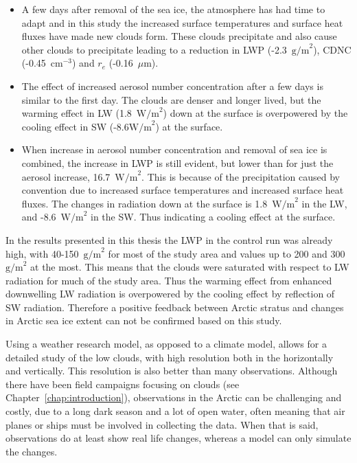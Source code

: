 \begin{itemize}
\item A few days after removal of the sea ice, the atmosphere has had time to adapt and in this study the increased surface temperatures and surface heat fluxes have made new clouds form. These clouds precipitate and also cause other clouds to precipitate leading to a reduction in LWP (-2.3~$\text{g/m}^2$), CDNC (-0.45~$\text{cm}^{-3}$) and $r_e$ (-0.16~$\mu\text{m}$).
\item The effect of increased aerosol number concentration after a few days is similar to the first day. The clouds are denser and longer lived, but the warming effect in LW (1.8~$\text{W/m}^2$) down at the surface is overpowered by the cooling effect in SW (-8.6$\text{W/m}^2$) at the surface.
\item When increase in aerosol number concentration and removal of sea ice is combined, the increase in LWP is still evident, but lower than for just the aerosol increase, 16.7~$\text{W/m}^2$. This is because of the precipitation caused by convention due to increased surface temperatures and increased surface heat fluxes. The changes in radiation down at the surface is 1.8~$\text{W/m}^2$ in the LW, and -8.6~$\text{W/m}^2$ in the SW. Thus indicating a cooling effect at the surface.
\end{itemize}

In the results presented in this thesis the LWP in the control run was already high, with 40-150~$\text{g/m}^2$ for most of the study area and values up to 200 and 300~$\text{g/m}^2$ at the most. This means that the clouds were saturated with respect to LW radiation for much of the study area. Thus the warming effect from enhanced downwelling LW radiation is overpowered by the cooling effect by reflection of SW radiation. Therefore a positive feedback between Arctic stratus and changes in Arctic sea ice extent can not be confirmed based on this study.

Using a weather research model, as opposed to a climate model, allows for a detailed study of the low clouds, with high resolution both in the horizontally and vertically. This resolution is also better than many observations. Although there have been field campaigns focusing on clouds (see Chapter~\ref{chap:introduction}), observations in the Arctic can be challenging and costly, due to a long dark season and a lot of open water, often meaning that air planes or ships must be involved in collecting the data. When that is said, observations do at least show real life changes, whereas a model can only simulate the changes.


